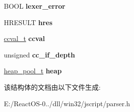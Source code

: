 \begin{DoxyCompactItemize}
B\+O\+OL {\bfseries lexer\+\_\+error}
\item 
\mbox{\label{struct__parser__ctx__t_ab7b016f451677e718ecb606521de54b0}} 
H\+R\+E\+S\+U\+LT {\bfseries hres}
\item 
\mbox{\label{struct__parser__ctx__t_a24804f15991f7d50d7f1c11dbffee943}} 
\hyperlink{structccval__t}{ccval\+\_\+t} {\bfseries ccval}
\item 
\mbox{\label{struct__parser__ctx__t_ab703f21e3c7497c6433107d70197517c}} 
unsigned {\bfseries cc\+\_\+if\+\_\+depth}
\item 
\mbox{\label{struct__parser__ctx__t_a00f6e36de19ec7e44646e8be913126e6}} 
\hyperlink{structheap__pool__t}{heap\+\_\+pool\+\_\+t} {\bfseries heap}
\end{DoxyCompactItemize}


该结构体的文档由以下文件生成\+:\begin{DoxyCompactItemize}
\item 
E\+:/\+React\+O\+S-\/0../dll/win32/jscript/parser.\+h\end{DoxyCompactItemize}

